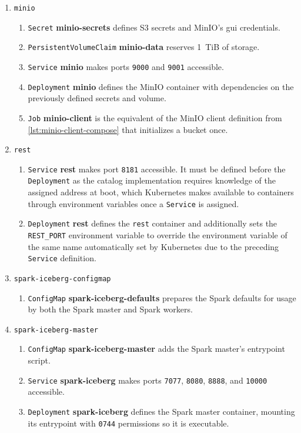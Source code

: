 \begin{enumerate}
  \item \texttt{minio}
  \begin{enumerate}
    \item \texttt{Secret} \textbf{minio-secrets} defines S3 secrets and MinIO's \ac{gui} credentials.
    \item \texttt{PersistentVolumeClaim} \textbf{minio-data} reserves 1~TiB of storage.
    \item \texttt{Service} \textbf{minio} makes ports \texttt{9000} and \texttt{9001} accessible.
    \item \texttt{Deployment} \textbf{minio} defines the MinIO container with dependencies on the previously defined secrets and volume.
    \item \texttt{Job} \textbf{minio-client} is the equivalent of the MinIO client definition from \cref{lst:minio-client-compose} that initializes a bucket once.
  \end{enumerate}

  \item \texttt{rest}
  \begin{enumerate}
    \item \texttt{Service} \textbf{rest} makes port \texttt{8181} accessible. It must be defined before the \texttt{Deployment} as the catalog implementation requires knowledge of the assigned address at boot, which Kubernetes makes available to containers through environment variables once a \texttt{Service} is assigned.
    \item \texttt{Deployment} \textbf{rest} defines the \texttt{rest} container and additionally sets the \texttt{REST\_PORT} environment variable to override the environment variable of the same name automatically set by Kubernetes due to the preceding \texttt{Service} definition.
  \end{enumerate}

  \item \texttt{spark-iceberg-configmap}
  \begin{enumerate}
    \item \texttt{ConfigMap} \textbf{spark-iceberg-defaults} prepares the Spark defaults for usage by both the Spark master and Spark workers.
  \end{enumerate}

  \item \texttt{spark-iceberg-master}
  \begin{enumerate}
    \item \texttt{ConfigMap} \textbf{spark-iceberg-master} adds the Spark master's entrypoint script.
    \item \texttt{Service} \textbf{spark-iceberg} makes ports \texttt{7077}, \texttt{8080}, \texttt{8888}, and \texttt{10000} accessible.
    \item \texttt{Deployment} \textbf{spark-iceberg} defines the Spark master container, mounting its entrypoint with \texttt{0744} permissions so it is executable.
  \end{enumerate}


\end{enumerate}

